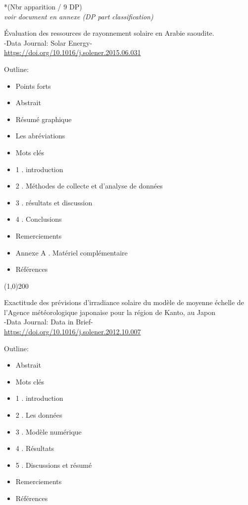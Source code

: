 \documentclass[11pt,oneside]{article}
\begin{document}
\begin{flushright}
*(Nbr apparition / 9 DP)\\
{\small \textit{voir document en annexe (DP part classification) }}\\
\end{flushright}
\newpage

\twocolumn
\setlength{\columnseprule}{0.01cm}
\begin{center}
Évaluation des ressources de rayonnement solaire en Arabie saoudite.\\
-Data Journal: Solar Energy-\\
\url {https://doi.org/10.1016/j.solener.2015.06.031}
\end{center}

\noindent Outline:
\begin{itemize}
\item Points forts
\item Abstrait
\item Résumé graphique
\item Les abréviations
\item Mots clés
\item 1 . introduction
\item 2 . Méthodes de collecte et d'analyse de données
\item 3 . résultats et discussion
\item 4 . Conclusions
\item Remerciements
\item Annexe A . Matériel complémentaire
\item Références
\end{itemize}

\line (1,0){200}

\begin{center}
Exactitude des prévisions d'irradiance solaire du modèle de moyenne échelle de l'Agence météorologique japonaise pour la région de Kanto, au Japon\\
-Data Journal: Data in Brief-\\
\url {https://doi.org/10.1016/j.solener.2012.10.007}
\end{center}
\noindent Outline:
\begin{itemize}
\item Abstrait
\item Mots clés
\item 1 . introduction
\item 2 . Les données
\item 3 . Modèle numérique
\item 4 . Résultats
\item 5 . Discussions et résumé
\item Remerciements
\item Références
\end{itemize}
\end{document}
